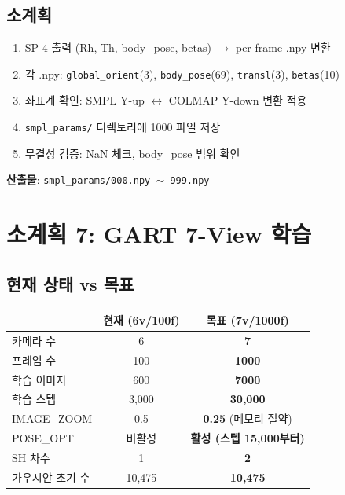 \documentclass[11pt, a4paper]{report}
\begin{document}
\subsection{소계획}
\begin{pipelinebox}[title={SP-6: SMPL 파라미터 $\to$ GART 입력 형식}]
\begin{enumerate}
\item SP-4 출력 (Rh, Th, body\_pose, betas) $\to$ per-frame .npy 변환
\item 각 .npy: \texttt{global\_orient}(3), \texttt{body\_pose}(69), \texttt{transl}(3), \texttt{betas}(10)
\item 좌표계 확인: SMPL Y-up $\leftrightarrow$ COLMAP Y-down 변환 적용
\item \texttt{smpl\_params/} 디렉토리에 1000 파일 저장
\item 무결성 검증: NaN 체크, body\_pose 범위 확인
\end{enumerate}
\textbf{산출물}: \texttt{smpl\_params/000.npy $\sim$ 999.npy}
\end{pipelinebox}


\section{소계획 7: GART 7-View 학습}
\label{sec:sp7}

\subsection{현재 상태 vs 목표}
\begin{center}
\renewcommand{\arraystretch}{1.2}
\begin{tabular}{lcc}
\toprule
& \textbf{현재 (6v/100f)} & \textbf{목표 (7v/1000f)} \\
\midrule
카메라 수 & 6 & \textbf{7} \\
프레임 수 & 100 & \textbf{1000} \\
학습 이미지 & 600 & \textbf{7000} \\
학습 스텝 & 3,000 & \textbf{30,000} \\
IMAGE\_ZOOM & 0.5 & \textbf{0.25} (메모리 절약) \\
POSE\_OPT & 비활성 & \textbf{활성 (스텝 15,000부터)} \\
SH 차수 & 1 & \textbf{2} \\
가우시안 초기 수 & 10,475 & \textbf{10,475} \\
\bottomrule
\end{tabular}
\end{center}
\end{document}
